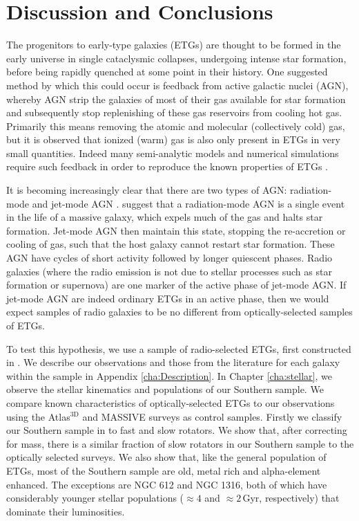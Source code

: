 \chapter{Discussion and Conclusions}
	\label{cha:conclusion}
The progenitors to early-type galaxies (ETGs) are thought to be formed in the early universe in single cataclysmic collapses, undergoing intense star formation, before being rapidly quenched at some point in their history. One suggested method by which this could occur is feedback from active galactic nuclei (AGN), whereby AGN strip the galaxies of most of their gas available for star formation and subsequently stop replenishing of these gas reservoirs from cooling hot gas. Primarily this means removing the atomic and molecular (collectively cold) gas, but it is observed that ionized (warm) gas is also only present in ETGs in very small quantities. Indeed many semi-analytic models and numerical simulations require such feedback in order to reproduce the known properties of ETGs \citep[e.g.][]{Kauffmann2000, DiMatteo2005, Springel2005, Bower2006}. 

It is becoming increasingly clear that there are two types of AGN: radiation-mode and jet-mode AGN \citep[e.g.][]{Antonucci2012}. \citet{Heckman2014} suggest that a radiation-mode AGN is a single event in the life of a massive galaxy, which expels much of the gas and halts star formation. Jet-mode AGN then maintain this state, stopping the re-accretion or cooling of gas, such that the host galaxy cannot restart star formation. These AGN have cycles of short activity followed by longer quiescent phases. Radio galaxies (where the radio emission is not due to stellar processes such as star formation or supernova) are one marker of the active phase of jet-mode AGN. If jet-mode AGN are indeed ordinary ETGs in an active phase, then we would expect samples of radio galaxies to be no different from optically-selected samples of ETGs. 

To test this hypothesis, we use a sample of radio-selected ETGs, first constructed in \citet[; hereafter the Southern sample]{Prandoni2010}. We describe our observations and those from the literature for each galaxy within the sample in Appendix \ref{cha:Description}. In Chapter \ref{cha:stellar}, we observe the stellar kinematics and populations of our Southern sample. We compare known characteristics of optically-selected ETGs to our observations using the Atlas$^\text{3D}$ and MASSIVE surveys as control samples. Firstly we classify our Southern sample in to fast and slow rotators. We show that, after correcting for mass, there is a similar fraction of slow rotators in our Southern sample to the optically selected surveys. We also show that, like the general population of ETGs, most of the Southern sample are old, metal rich and alpha-element enhanced. The exceptions are NGC 612 and NGC 1316, both of which have considerably younger stellar populations ($\approx 4$ and $\approx 2$\,Gyr, respectively) that dominate their luminosities. 

